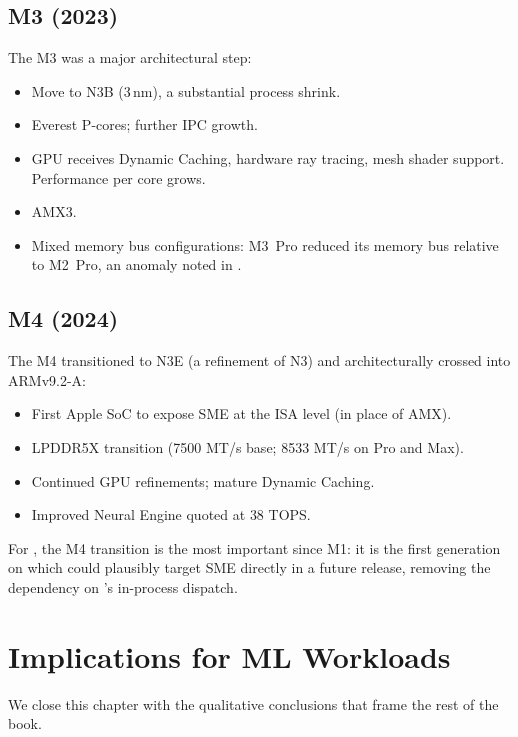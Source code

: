 \subsection{M3 (2023)}
\label{ssec:apple_silicon:m3}

The M3 was a major architectural step:
\begin{itemize}
  \item Move to N3B (3\,nm), a substantial process shrink.
  \item Everest P-cores; further IPC growth.
  \item GPU receives Dynamic Caching, hardware ray tracing, mesh
    shader support. Performance per core grows.
  \item AMX3.
  \item Mixed memory bus configurations: M3~Pro reduced its memory
    bus relative to M2~Pro, an anomaly noted in
    .
\end{itemize}

\subsection{M4 (2024)}
\label{ssec:apple_silicon:m4}

The M4 transitioned to N3E (a refinement of N3) and architecturally
crossed into ARMv9.2-A:
\begin{itemize}
  \item First Apple SoC to expose SME at the ISA level (in place of
    AMX).
  \item LPDDR5X transition (7500 MT/s base; 8533 MT/s on Pro and
    Max).
  \item Continued GPU refinements; mature Dynamic Caching.
  \item Improved Neural Engine quoted at $38$ TOPS.
\end{itemize}
For \Lucid, the M4 transition is the most important since M1: it is
the first generation on which  could plausibly
target SME directly in a future release, removing the dependency on
\Accelerate's in-process dispatch.

\section{Implications for ML Workloads}
\label{sec:apple_silicon:ml_implications}

We close this chapter with the qualitative conclusions that frame the
rest of the book.

